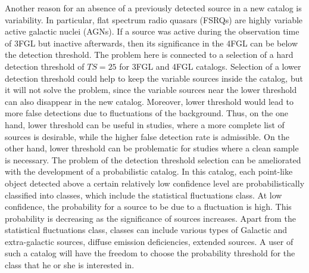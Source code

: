 Another reason for an absence of a previously detected source in a new catalog is variability.
In particular, flat spectrum radio quasars (FSRQs) are highly variable active galactic nuclei (AGNs).
If a source was active during the observation time of 3FGL but inactive afterwards, 
then its significance in the 4FGL can be below the detection threshold.
The problem here is connected to a selection of a hard detection threshold of $TS = 25$ for 3FGL and 4FGL catalogs.
Selection of a lower detection threshold could help to keep the variable sources inside the catalog, 
but it will not solve the problem, since the variable sources near the lower threshold can also disappear in the new catalog.
Moreover, lower threshold would lead to more false detections due to fluctuations of the background.
Thus, on the one hand, lower threshold can be useful in studies, where a more complete list of sources is desirable,
while the higher false detection rate is admissible. On the other hand, lower threshold can be problematic for studies where 
a clean sample is necessary. 
The problem of the detection threshold selection can be ameliorated with the development of a probabilistic catalog.
In this catalog, each point-like object detected above a certain relatively low confidence level
are probabilistically classified into classes, which include the statistical fluctuations class.
At low confidence, the probability for a source to be due to a fluctuation is high.
This probability is decreasing as the significance of sources increases.
Apart from the statistical fluctuations class, classes can include various types of Galactic and extra-galactic sources, diffuse emission deficiencies, extended sources.
A user of such a catalog will have the freedom to choose the probability threshold for the class that he or she is interested in.








